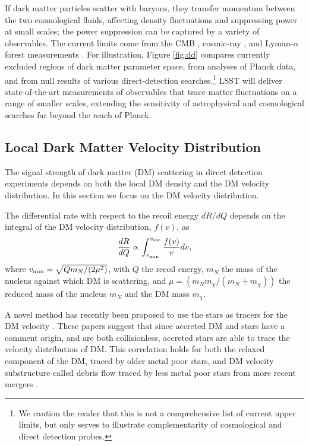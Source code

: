If dark matter particles scatter with baryons, they transfer momentum between the two cosmological fluids, affecting density fluctuations and suppressing power at small scales; the power suppression can be captured by a variety of observables. The current limits come from the CMB \citep{Gluscevic:2017ywp}, cosmic-ray \citep{Cappiello:2018hsu}, and Lyman-$\alpha$ forest measurements \citep{Xu:2018efh}. For illustration, Figure \ref{fig:dd} compares currently excluded regions of dark matter parameter space, from analyses of Planck data, and from null results of various direct-detection searches.\footnote{We caution the reader that this is not a comprehensive list of current upper limits, but only serves to illustrate complementarity of cosmological and direct detection probes.} LSST will deliver state-of-the-art measurements of observables that trace matter fluctuations on a range of smaller scales, extending the sensitivity of astrophysical and cosmological searches far beyond the reach of Planck.

\subsection{Local Dark Matter Velocity Distribution }


The signal strength of dark matter (DM) scattering in direct detection experiments depends on both the local DM density and the DM velocity distribution. In this section we focus on the DM velocity distribution.

The differential rate with respect to the recoil energy $dR/dQ$ depends on the integral of the DM velocity distribution, $f(v)$, as
\begin{equation}
    \frac{dR}{dQ} \propto \int_{v_{\rm{min}}}^{v_{\rm{esc}}} \frac{f(v)}{v} dv, 
\end{equation}
where $v_{\rm{min}} = \sqrt{Q m_N/ (2 \mu^2)}$, with $Q$ the recoil energy, $m_N$ the mass of the nucleus against which DM is scattering, and $\mu = (m_N m_\chi / (m_N + m_\chi))$ the reduced mass of the nucleus $m_N$ and the DM mass $m_\chi$.

A novel method has recently been proposed to use the stars as tracers for the DM velocity \citep{Herzog-Arbeitman:2017fte,Necib:2018b}. These papers suggest that since accreted DM and stars have a comment origin, and are both collisionless, accreted stars are able to trace the velocity distribution of DM. This correlation holds for both the relaxed component of the DM, traced by older metal poor stars, and DM velocity substructure called debris flow traced by less metal poor stars from more recent mergers \citep{Lisanti:2011as,Kuhlen:2012fz,Lisanti:2014dva}. 

